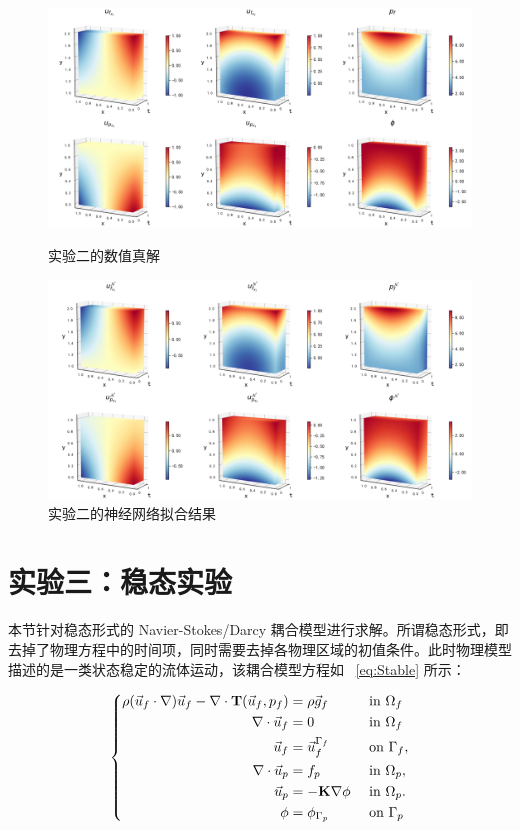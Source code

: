 \begin{figure}[H]
    \centering
    \includegraphics[width=0.75\linewidth]{images/example2_exact.png}
    \caption{实验二的数值真解}
    \label{fig:example2_exact}
    \includegraphics[width=0.75\linewidth]{images/example2_fitted.png}
    \caption{实验二的神经网络拟合结果}
    \label{fig:example2_fitted}
\end{figure}

\section{实验三：稳态实验}
本节针对稳态形式的 Navier-Stokes/Darcy 耦合模型进行求解。所谓稳态形式，即去掉了物理方程中的时间项，同时需要去掉各物理区域的初值条件。此时物理模型描述的是一类状态稳定的流体运动，该耦合模型方程如 ~\eqref{eq:Stable} 所示：

\begin{equation}\label{eq:Stable}
    \left\{
        \begin{aligned}
            \rho (\vec{u}_f \cdot \nabla) \vec{u}_f - \nabla \cdot \mathbf{T}(\vec{u}_f,p_f) &= \rho\vec{g}_f & & \textrm{ in } \Omega_f\\  
            \nabla \cdot \vec{u}_f &= 0 & & \text{ in } \Omega_f \\
            \vec{u}_f &= \vec{u}_f^{\Gamma_f} & & \text{ on } \Gamma_f,\\
            \nabla \cdot \vec{u}_p &=f_p & & \text { in } \Omega_p, \\
            \vec{u}_p &= -\mathbf{K} \nabla \phi & & \text { in } \Omega_p.\\
            \phi &=\phi_{\Gamma_p} & & \text { on } \Gamma_p
        \end{aligned}
    \right.
\end{equation}

